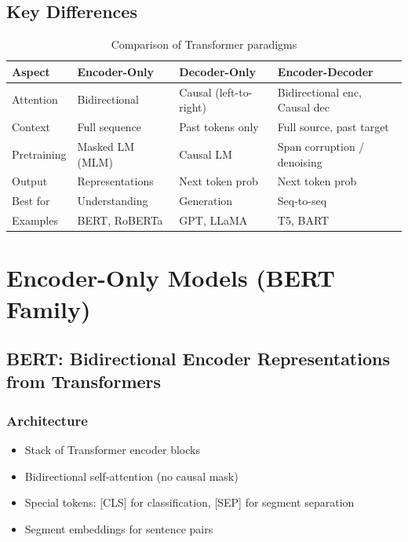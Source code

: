 \subsection{Key Differences}

\begin{table}[H]
\centering
\caption{Comparison of Transformer paradigms}
\begin{tabularx}{\textwidth}{lXXX}
\toprule
\textbf{Aspect} & \textbf{Encoder-Only} & \textbf{Decoder-Only} & \textbf{Encoder-Decoder} \\
\midrule
Attention & Bidirectional & Causal (left-to-right) & Bidirectional enc, Causal dec \\
Context & Full sequence & Past tokens only & Full source, past target \\
Pretraining & Masked LM (MLM) & Causal LM & Span corruption / denoising \\
Output & Representations & Next token prob & Next token prob \\
Best for & Understanding & Generation & Seq-to-seq \\
Examples & BERT, RoBERTa & GPT, LLaMA & T5, BART \\
\bottomrule
\end{tabularx}
\end{table}

\section{Encoder-Only Models (BERT Family)}
\label{sec:encoder_only}

\subsection{BERT: Bidirectional Encoder Representations from Transformers}

\subsubsection{Architecture}

\begin{itemize}
    \item Stack of Transformer encoder blocks
    \item Bidirectional self-attention (no causal mask)
    \item Special tokens: [CLS] for classification, [SEP] for segment separation
    \item Segment embeddings for sentence pairs
\end{itemize}

